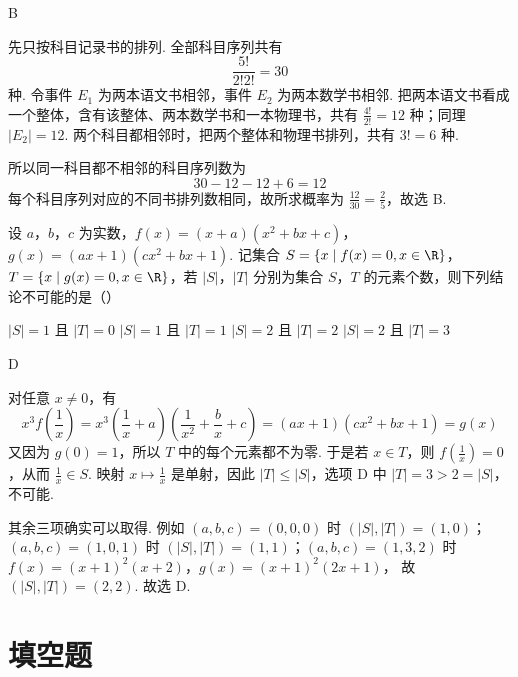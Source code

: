 \begin{answer}
B
\end{answer}

\begin{solution}
先只按科目记录书的排列. 全部科目序列共有
\[
\frac{5!}{2!2!}=30
\]
种. 令事件 \(E_1\) 为两本语文书相邻，事件 \(E_2\) 为两本数学书相邻. 把两本语文书看成一个整体，含有该整体、两本数学书和一本物理书，共有 \(\frac{4!}{2!}=12\) 种；同理 \(\lvert E_2\rvert=12\). 两个科目都相邻时，把两个整体和物理书排列，共有 \(3!=6\) 种.

所以同一科目都不相邻的科目序列数为
\[
30-12-12+6=12
\]
每个科目序列对应的不同书排列数相同，故所求概率为 \(\frac{12}{30}=\frac{2}{5}\)，故选 B.
\end{solution}

\begin{problem}
设 \(a\)，\(b\)，\(c\) 为实数，\(f(x) = (x + a)(x^2 + bx + c)\)，\(g(x) = (ax + 1)(cx^2 + bx + 1)\). 记集合 \(S = \{x \mid f(x) = 0, x \in \R\}\)，\(T = \{x \mid g(x) = 0, x \in \R\}\)，若 \(|S|\)，\(|T|\) 分别为集合 \(S\)，\(T\) 的元素个数，则下列结论不可能的是（\quad）

\choices
    {\( |S| = 1 \) 且 \( |T| = 0 \)}
    {\( |S| = 1 \) 且 \( |T| = 1 \)}
    {\( |S| = 2 \) 且 \( |T| = 2 \)}
    {\( |S| = 2 \) 且 \( |T| = 3 \)}
\end{problem}

\begin{answer}
D
\end{answer}

\begin{solution}
对任意 \(x\neq 0\)，有
\[
x^3f\left(\frac{1}{x}\right)=x^3\left(\frac{1}{x}+a\right)\left(\frac{1}{x^2}+\frac{b}{x}+c\right)=(ax+1)(cx^2+bx+1)=g(x)
\]
又因为 \(g(0)=1\)，所以 \(T\) 中的每个元素都不为零. 于是若 \(x\in T\)，则 \(f(\frac{1}{x})=0\)，从而 \(\frac{1}{x}\in S\). 映射 \(x\mapsto \frac{1}{x}\) 是单射，因此 \(\lvert T\rvert\leqslant\lvert S\rvert\)，选项 D 中 \(\lvert T\rvert=3>2=\lvert S\rvert\)，不可能.

其余三项确实可以取得. 例如 \((a,b,c)=(0,0,0)\) 时 \((\lvert S\rvert,\lvert T\rvert)=(1,0)\)；\((a,b,c)=(1,0,1)\) 时 \((\lvert S\rvert,\lvert T\rvert)=(1,1)\)；\((a,b,c)=(1,3,2)\) 时
\(f(x)=(x+1)^2(x+2)\)，\(g(x)=(x+1)^2(2x+1)\)，
故 \((\lvert S\rvert,\lvert T\rvert)=(2,2)\). 故选 D.
\end{solution}

\section{填空题}

